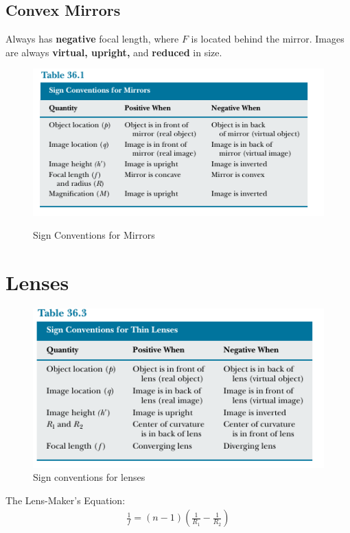 \documentclass[a4paper,10pt]{report}
\begin{document}
\subsection{Convex Mirrors}
Always has \textbf{negative} focal length, where $F$ is located behind the mirror.
Images are always \textbf{virtual, upright,} and \textbf{reduced} in size.
\begin{figure}[h!]
  \begin{centering}
  \begin{center}
  \includegraphics[width=0.5\linewidth]{./Images/mirrorsignconv.png}
  \label{fig:mirror_sign_conventions}
  \caption{Sign Conventions for Mirrors}
  \end{center}
  \par\end{centering}
  \end{figure}

\section{Lenses}

\begin{figure}[h!]
  \begin{centering}
  \begin{center}
  \includegraphics[width=0.5\linewidth]{./Images/lens_conventions.png}
  \caption{Sign conventions for lenses}
  \label{fig:lens_conventions}
  \end{center}
  \par\end{centering}
  \end{figure}

  The Lens-Maker's Equation:
  \begin{align*}
    \frac{1}{f} = (n-1)\left(\frac{1}{R_1} - \frac{1}{R_2}\right)
  \end{align*}
\end{document}
